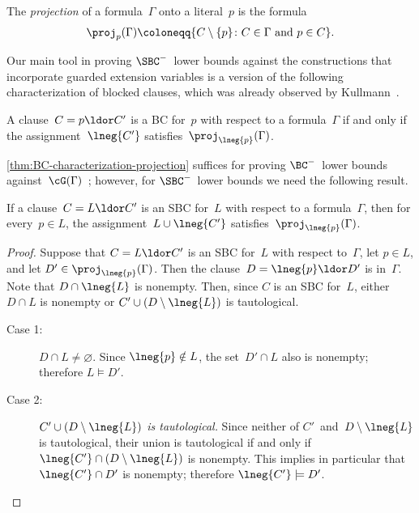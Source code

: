 \documentclass[12pt]{article}
\begin{document}
\begin{definition}\label{def:projection}
  The \emph{projection} of a formula~$\Gamma$ onto a literal~$p$ is the formula
  \begin{equation*}
    \proj_p(\Gamma) \coloneqq \{C \setminus \{p\} \colon
    C \in \Gamma \text{ and } p \in C\}.
  \end{equation*}
\end{definition}

Our main tool in proving $\SBC^-$~lower bounds against
the constructions that incorporate guarded extension variables
is a version of the following characterization of blocked clauses,
which was already observed by Kullmann~\cite[see][Section~4]{Kul99b}.

\begin{lemma}[{\cite[Lemma~3.15]{YH23}}]\label{thm:BC-characterization-projection}
  A clause~$C = p \ldor C'$ is a BC for~$p$ with respect to a formula~$\Gamma$
  if and only if the assignment~$\lneg{C'}$ satisfies~$\proj_{\lneg{p}}(\Gamma)$.
\end{lemma}

\cref{thm:BC-characterization-projection} suffices for proving
$\BC^-$~lower bounds against~$\cG(\Gamma)$~\cite[see][Lemma~5.2]{YH23};
however, for $\SBC^-$~lower bounds we need the following result.

\begin{lemma}\label{thm:SBC-projection-onto-literal}
  If a clause~$C = L \ldor C'$ is an SBC
  for~$L$ with respect to a formula~$\Gamma$,
  then for every~$p \in L$, the assignment~$L \cup \lneg{C'}$
  satisfies~$\proj_{\lneg{p}}(\Gamma)$.
\end{lemma}
\begin{proof}
  Suppose that $C = L \ldor C'$ is an SBC for~$L$ with respect to~$\Gamma$,
  let $p \in L$, and let $D' \in \proj_{\lneg{p}}(\Gamma)$.
  Then the clause~$D = \lneg{p} \ldor D'$ is in~$\Gamma$.
  Note that $D \cap \lneg{L}$ is nonempty.
  Then, since $C$ is an SBC for~$L$, either $D \cap L$ is nonempty
  or $C' \cup (D \setminus \lneg{L})$ is tautological.

  \begin{description}
  \item[Case 1:] $D \cap L \neq \varnothing$.
    Since $\lneg{p} \notin L$, the set~$D' \cap L$ also is nonempty;
    therefore $L \models D'$.
  \item[Case 2:] \textit{$C' \cup (D \setminus \lneg{L})$ is tautological.}
    Since neither of $C'$~and~$D \setminus \lneg{L}$ is tautological,
    their union is tautological if and only if
    $\lneg{C'} \cap (D \setminus \lneg{L})$ is nonempty.
    This implies in particular that $\lneg{C'} \cap D'$ is nonempty;
    therefore $\lneg{C'} \models D'$. \qedhere
  \end{description}
\end{proof}
\end{document}
